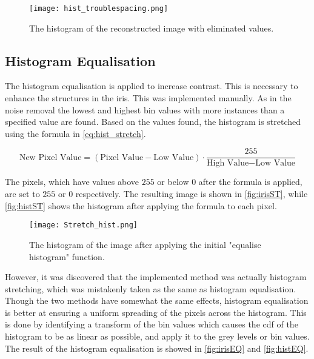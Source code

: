 \begin{figure}[H]
	\centering
	\texttt{[image: hist\_troublespacing.png]}
	\caption{The histogram of the reconstructed image with eliminated values.}
	\label{fig:HistEli}
\end{figure} 

\subsection{Histogram Equalisation}
\label{sec:HistEq}
The histogram equalisation is applied to increase contrast. This is necessary to enhance the structures in the iris. This was implemented manually. As in the noise removal the lowest and highest bin values with more instances than a specified value are found. Based on the values found, the histogram is stretched using the formula in \autoref{eq:hist_stretch}.

\begin{equation}\label{eq:hist_stretch}
	\text{New~Pixel~Value}=(\text{Pixel~Value}-\text{Low~Value})\cdot\frac{255}{\text{High~Value}-\text{Low~Value}}
\end{equation}

The pixels, which have values above $ 255 $ or below $ 0 $ after the formula is applied, are set to $ 255 $ or $ 0 $ respectively. The resulting image is shown in \autoref{fig:irisST}, while \autoref{fig:histST} shows the histogram after applying the formula to each pixel.

\begin{figure}[H]
\centering
\texttt{[image: Stretch\_hist.png]}
\caption{The histogram of the image after applying the initial "equalise histogram" function.}
\label{fig:histST}
\end{figure}

However, it was discovered that the implemented method was actually histogram stretching, which was mistakenly taken as the same as histogram equalisation. Though the two methods have somewhat the same effects, histogram equalisation is better at ensuring a uniform spreading of the pixels across the histogram. 
This is done by identifying a transform of the bin values which causes the \gls{cdf} of the histogram to be as linear as possible, and apply it to the grey levels or bin values. The result of the histogram equalisation is showed in \autoref{fig:irisEQ} and \autoref{fig:histEQ}.

